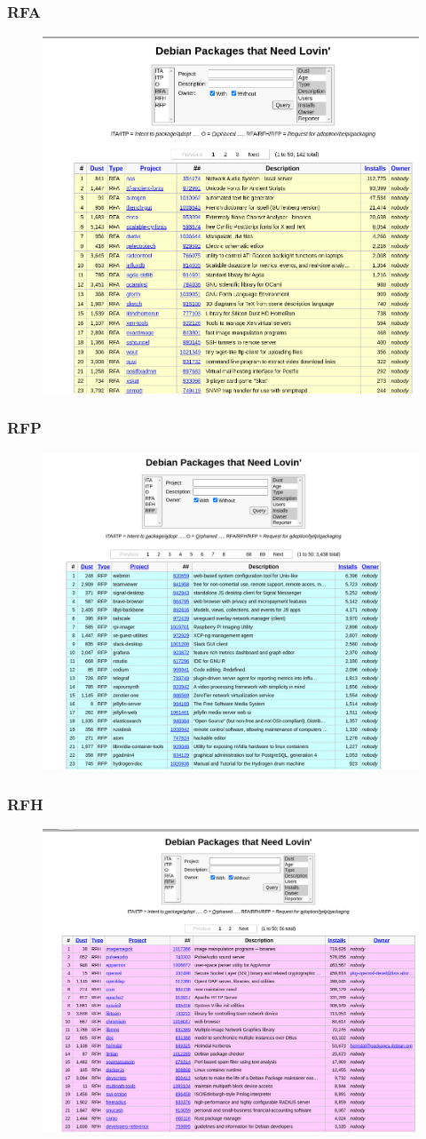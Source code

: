 \documentclass{beamer}
\begin{document}
\begin{frame}
 \frametitle{RFA}
    \begin{figure}
		\centering
		\includegraphics[width=0.7\linewidth]{images/rfa}
		\label{fig:rfa}
	\end{figure}
\end{frame}

\begin{frame}
 \frametitle{RFP}
    \begin{figure}
		\centering
		\includegraphics[width=0.7\linewidth]{images/rfp}
		\label{fig:rfp}
	\end{figure}
\end{frame}

\begin{frame}
 \frametitle{RFH}
    \begin{figure}
		\centering
		\includegraphics[width=0.7\linewidth]{images/rfh}
		\label{fig:rfh}
	\end{figure}
\end{frame}
\end{document}
